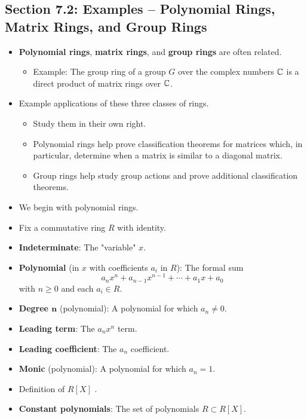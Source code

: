 \documentclass[../notes.tex]{subfiles}
\begin{document}
\subsection*{Section 7.2: Examples -- Polynomial Rings, Matrix Rings, and Group Rings}
\begin{itemize}
    \item \textbf{Polynomial rings}, \textbf{matrix rings}, and \textbf{group rings} are often related.
    \begin{itemize}
        \item Example: The group ring of a group $G$ over the complex numbers $\mathbb{C}$ is a direct product of matrix rings over $\mathbb{C}$.
    \end{itemize}
    \item Example applications of these three classes of rings.
    \begin{itemize}
        \item Study them in their own right.
        \item Polynomial rings help prove classification theorems for matrices which, in particular, determine when a matrix is similar to a diagonal matrix.
        \item Group rings help study group actions and prove additional classification theorems.
    \end{itemize}
    \item We begin with polynomial rings.
    \item Fix a commutative ring $R$ with identity.
    \item \textbf{Indeterminate}: The "variable" $x$.
    \item \textbf{Polynomial} (in $x$ with coefficients $a_i$ in $R$): The formal sum
    \begin{equation*}
        a_nx^n+a_{n-1}x^{n-1}+\cdots+a_1x+a_0
    \end{equation*}
    with $n\geq 0$ and each $a_i\in R$.
    \item \textbf{Degree $\bm{n}$} (polynomial): A polynomial for which $a_n\neq 0$.
    \item \textbf{Leading term}: The $a_nx^n$ term.
    \item \textbf{Leading coefficient}: The $a_n$ coefficient.
    \item \textbf{Monic} (polynomial): A polynomial for which $a_n=1$.
    \item Definition of $R[X]$ \parencite[234]{bib:DummitFoote}.
    \item \textbf{Constant polynomials}: The set of polynomials $R\subset R[X]$.

\end{itemize}
\end{document}
